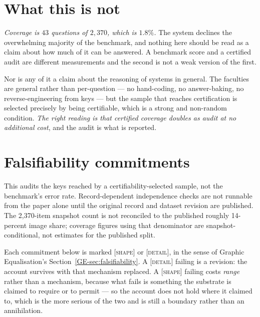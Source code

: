 \documentclass[11pt,a4paper]{article}
\theoremstyle{remark}
\begin{document}
\section{What this is not}\label{sec:not}
\emph{Coverage is $43$ questions of $2{,}370$, which is $1.8\%$.} The system declines the overwhelming
majority of the benchmark, and nothing here should be read as a claim about how much of it can be
answered. A benchmark score and a certified audit are different measurements and the second is not a
weak version of the first.

Nor is any of it a claim about the reasoning of systems in general. The faculties are general rather
than per-question --- no hand-coding, no answer-baking, no reverse-engineering from keys --- but the
sample that reaches certification is selected precisely by being certifiable, which is a strong and
non-random condition. \emph{The right reading is that certified coverage doubles as audit at no
additional cost}, and the audit is what is reported.

\section{Falsifiability commitments}\label{sec:falsifiability}
This audits the keys reached by a certifiability-selected sample, not the
benchmark's error rate. Record-dependent independence checks are not runnable
from the paper alone until the original record and dataset revision are
published. The 2,370-item snapshot count is not reconciled to the published
roughly 14-percent image share; coverage figures using that denominator are
snapshot-conditional, not estimates for the published split.

Each commitment below is marked \textsc{[shape]} or \textsc{[detail]}, in the sense of Graphic
Equalisation's Section~\ref{GE-sec:falsifiability}. A \textsc{[detail]} failing is a revision: the
account survives with that mechanism replaced. A \textsc{[shape]} failing costs \emph{range} rather
than a mechanism, because what fails is something the substrate is claimed to require or to permit ---
so the account does not hold where it claimed to, which is the more serious of the two and is still a
boundary rather than an annihilation.
\end{document}

